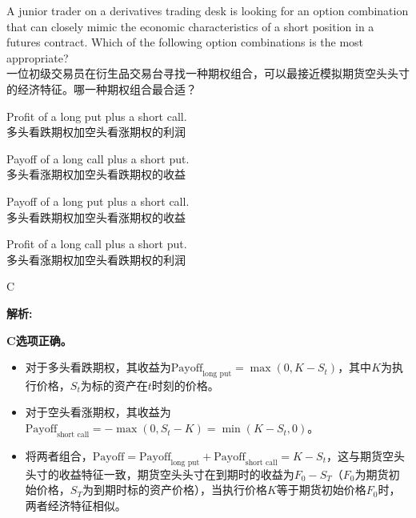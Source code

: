 \documentclass{article}
\newcounter{question} %
\newenvironment{explanation}
{\textbf{解析:}\par}
{\par}
\begin{document}
\begin{question}
    A junior trader on a derivatives trading desk is looking for an option combination that can closely mimic the economic characteristics of a short position in a futures contract. Which of the following option combinations is the most appropriate?
    \\一位初级交易员在衍生品交易台寻找一种期权组合，可以最接近模拟期货空头头寸的经济特征。哪一种期权组合最合适？
    \end{question}
    
    \begin{choices}
        \item Profit of a long put plus a short call.\\
        多头看跌期权加空头看涨期权的利润
        \item Payoff of a long call plus a short put.\\
        多头看涨期权加空头看跌期权的收益
        \item Payoff of a long put plus a short call.\\
        多头看跌期权加空头看涨期权的收益
        \item Profit of a long call plus a short put.\\
        多头看涨期权加空头看跌期权的利润
    \end{choices}
    
    \begin{correctanswer}
        C
    \end{correctanswer}
    
    \begin{explanation}
    \textbf{C选项正确。}
    \begin{itemize}
        \item 对于多头看跌期权，其收益为\(\text{Payoff}_{\text{long put}}=\max(0, K - S_t)\)，其中\(K\)为执行价格，\(S_t\)为标的资产在\(t\)时刻的价格。
        \item 对于空头看涨期权，其收益为\(\text{Payoff}_{\text{short call}}=-\max(0, S_t - K)=\min(K - S_t, 0)\)。
        \item 将两者组合，\(\text{Payoff}=\text{Payoff}_{\text{long put}}+\text{Payoff}_{\text{short call}}=K - S_t\)，这与期货空头头寸的收益特征一致，期货空头头寸在到期时的收益为\(F_0 - S_T\)（\(F_0\)为期货初始价格，\(S_T\)为到期时标的资产价格），当执行价格\(K\)等于期货初始价格\(F_0\)时，两者经济特征相似。
    \end{itemize}
    \end{explanation}
    
\end{document}
